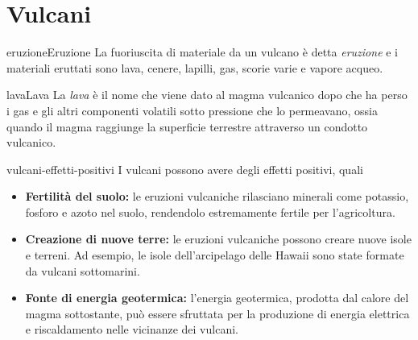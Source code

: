 \documentclass[preview]{standalone}
\begin{document}
\genpage

\section{Vulcani}

\begin{snippetdefinition}{eruzione}{Eruzione}
    La fuoriuscita di materiale da un vulcano è detta \textit{eruzione}
    e i materiali eruttati sono lava, cenere, lapilli, gas, scorie varie e vapore acqueo.
\end{snippetdefinition}


\begin{snippetdefinition}{lava}{Lava}
    La \textit{lava} è il nome che viene dato al magma vulcanico
    dopo che ha perso i gas e gli altri componenti volatili sotto pressione che lo permeavano,
    ossia quando il magma raggiunge la superficie terrestre attraverso un condotto vulcanico.
\end{snippetdefinition}


\begin{snippet}{vulcani-effetti-positivi}
    I vulcani possono avere degli effetti positivi, quali
    \begin{itemize}
        \item \textbf{Fertilità del suolo:} le eruzioni vulcaniche rilasciano minerali come potassio,
            fosforo e azoto nel suolo, rendendolo estremamente fertile per l'agricoltura.
        \item \textbf{Creazione di nuove terre:} le eruzioni vulcaniche possono creare nuove isole
            e terreni. Ad esempio, le isole dell'arcipelago delle Hawaii sono state formate
            da vulcani sottomarini.
        \item \textbf{Fonte di energia geotermica:} l'energia geotermica, prodotta dal calore
            del magma sottostante, può essere sfruttata per la produzione
            di energia elettrica e riscaldamento nelle vicinanze dei vulcani.
    \end{itemize}
\end{snippet}
\end{document}

